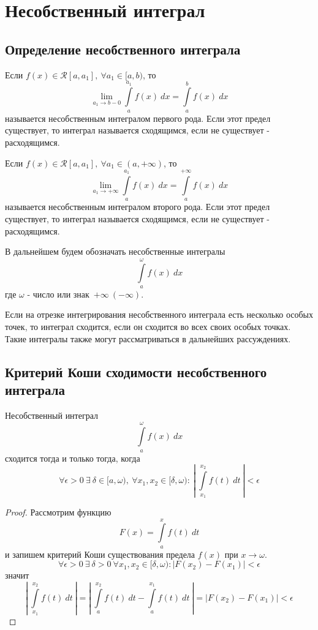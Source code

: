 \newpage
\section{Несобственный интеграл}
\subsection{Определение несобственного интеграла}
\begin{definition}
    Если $f(x)\in \mathcal{R}[a,a_1],\ \forall a_1\in [a,b)$, то 
    \[\lim\limits_{a_1\to b-0}\int\limits_{a}^{a_1}f(x)\ dx=\int\limits_{a}^{b}f(x)\ dx\]
    называется несобственным интегралом первого рода.
    Если этот предел существует, то интеграл называется сходящимся, если не существует - расходящимся. 
\end{definition} 
\begin{definition}
    Если $f(x)\in \mathcal{R}[a,a_1],\ \forall a_1\in (a, +\infty)$, то
    \[\lim\limits_{a_1\to +\infty} \int\limits_{a}^{a_1}f(x)\ dx=\int\limits_{a}^{+\infty}f(x)\ dx\]
    называется несобственным интегралом второго рода. Если этот предел существует, то интеграл называется сходящимся, если не существует - расходящимся.
\end{definition} 
\begin{comm}
    В дальнейшем будем обозначать несобственные интегралы
    \[\int\limits_{a}^{\omega}f(x)\ dx\]
    где $\omega$ - число или знак\ $+\infty\ (-\infty)$.
\end{comm} 
\begin{comm}
    Если на отрезке интегрирования несобственного интеграла есть несколько особых точек, то интеграл сходится, если он сходится во всех своих особых точках. Такие интегралы также могут рассматриваться в дальнейших рассуждениях.
\end{comm}
\subsection{Критерий Коши сходимости несобственного интеграла}
\begin{theorem}
    Несобственный интеграл
    \[\int\limits_{a}^{\omega}f(x)\ dx\]
    сходится тогда и только тогда, когда
    \[\forall \epsilon>0\ \exists\ \delta\in [a,\omega),\ \forall x_1,x_2\in [\delta, \omega):\ \left|\ \int\limits_{x_1}^{x_2}f(t)\ dt\ \right|<\epsilon\]
\end{theorem} 
\begin{proof}
    Рассмотрим функцию
    \[F(x)=\int\limits_{a}^{x}f(t)\ dt\]
    и запишем критерий Коши существования предела $f(x)$ при $x \to \omega$.
    \[\forall \epsilon>0\ \exists\ \delta>0\ \forall x_1, x_2\in [\delta, \omega): |F(x_2)-F(x_1)|<\epsilon\]
    значит
    \[\left|\ \int\limits_{x_1}^{x_2}f(t)\ dt\ \right|=\left|\ \int\limits_{a}^{x_2}f(t)\ dt-\int\limits_{a}^{x_1}f(t)\ dt\ \right|=|F(x_2)-F(x_1)|<\epsilon\]
\end{proof} 
